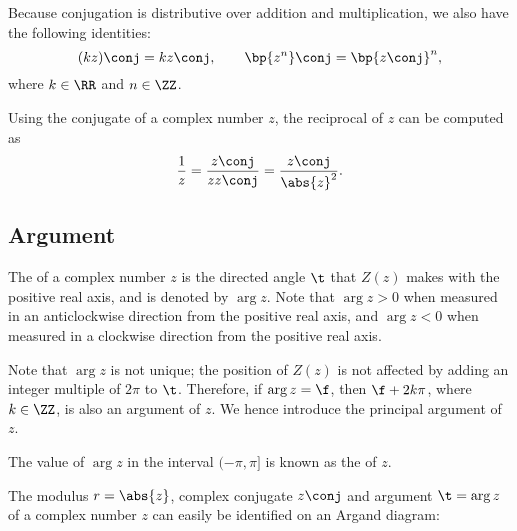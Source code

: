 Because conjugation is distributive over addition and multiplication, we also have the following identities: \[(kz)\conj = k z\conj, \qquad \bp{z^n}\conj = \bp{z\conj}^n,\] where $k \in \RR$ and $n \in \ZZ$.

Using the conjugate of a complex number $z$, the reciprocal of $z$ can be computed as \[\frac1{z} = \frac{z\conj}{z z\conj} = \frac{z \conj}{\abs{z}^2}.\]

\subsection{Argument}

\begin{definition}
    The  of a complex number $z$ is the directed angle $\t$ that $Z(z)$ makes with the positive real axis, and is denoted by $\arg{z}$. Note that $\arg{z} > 0$ when measured in an anticlockwise direction from the positive real axis, and $\arg{z} < 0$ when measured in a clockwise direction from the positive real axis.
\end{definition}

Note that $\arg{z}$ is not unique; the position of $Z(z)$ is not affected by adding an integer multiple of $2\pi$ to $\t$. Therefore, if $\arg{z} = \f$, then $\f + 2k\pi$, where $k \in \ZZ$, is also an argument of $z$. We hence introduce the principal argument of $z$.

\begin{definition}
    The value of $\arg{z}$ in the interval $(-\pi, \pi]$ is known as the  of $z$.
\end{definition}

The modulus $r = \abs{z}$, complex conjugate $z\conj$ and argument $\t = \arg{z}$ of a complex number $z$ can easily be identified on an Argand diagram:

